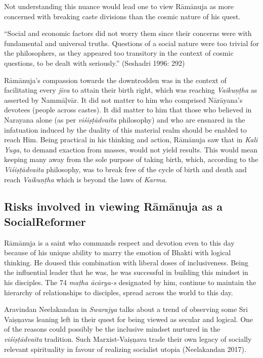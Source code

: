 Not understanding this nuance would lead one to view Rāmānuja as more concerned with breaking caste divisions than the cosmic nature of his quest.

“Social and economic factors did not worry them since their concerns were with fundamental and universal truths. Questions of a social nature were too trivial for the philosophers, as they appeared too transitory in the context of cosmic questions, to be dealt with seriously.” (Seshadri 1996: 292)

Rāmānuja’s compassion towards the downtrodden was in the context of facilitating every \textit{jīva} to attain their birth right, which was reaching \textit{Vaikuņṭha} as asserted by Nammāḷvār. It did not matter to him who comprised Nārāyana’s devotees (people across castes). It did matter to him that those who believed in Narayana alone (as per \textit{viśiṣṭādvaita} philosophy) and who are ensnared in the infatuation induced by the duality of this material realm should be enabled to reach Him. Being practical in his thinking and action, Rāmānuja saw that in \textit{Kali Yuga}, to demand exaction from masses, would not yield results. This would mean keeping many away from the sole purpose of taking birth, which, according to the \textit{Viśiṣṭādvaita} philosophy, was to break free of the cycle of birth and death and reach \textit{Vaikuņṭha }which is beyond the laws of \textit{Karma}.


\subsection*{Risks involved in viewing Rāmānuja as a Social\hfill \break Reformer}

Rāmānuja is a saint who commands respect and devotion even to this day because of his unique ability to marry the emotion of Bhakti with logical thinking. He doused this combination with liberal doses of inclusiveness. Being the influential leader that he was, he was successful in building this mindset in his disciples. The 74 \textit{maṭha ācārya-s} designated by him, continue to maintain the hierarchy of relationships to disciples, spread across the world to this day.

\vskip 4pt

Aravindan Neelakandan in \textit{Swarajya} talks about a trend of observing some Sri Vaiṣņavas leaning left in their quest for being viewed as secular and logical. One of the reasons could possibly be the inclusive mindset nurtured in the \textit{viśiṣṭādvaita} tradition. Such Marxist-Vaiṣņava trade their own legacy of socially relevant spirituality in favour of realizing socialist utopia (Neelakandan 2017).

